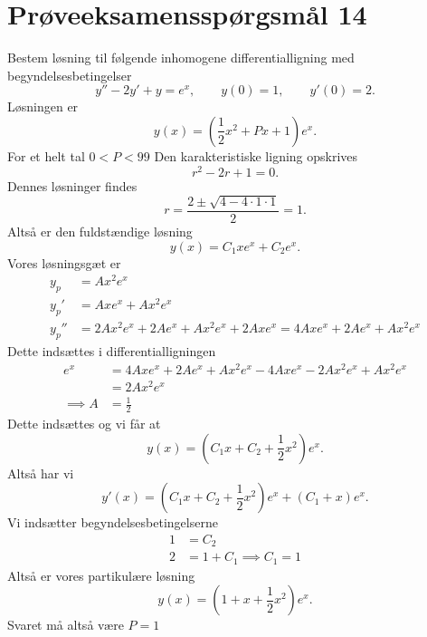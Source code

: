 \documentclass[12pt]{article}
\theoremstyle{definition}
\begin{document}
\section*{Prøveeksamensspørgsmål 14}
Bestem løsning til følgende inhomogene differentialligning med begyndelsesbetingelser
\[
y'' - 2y' + y = e^{x}, \qquad y(0) = 1, \qquad y'(0) = 2
.\]
Løsningen er
\[
y(x) = \left( \frac{1}{2}x^2 + Px + 1 \right)e^x
.\]
For et helt tal $0<P<99$
\bigbreak
Den karakteristiske ligning opskrives
\[
r^2 - 2r + 1 = 0
.\]
Dennes løsninger findes
\[
r = \frac{2 \pm \sqrt{4-4\cdot1 \cdot 1} }{2} = 1 
.\]
Altså er den fuldstændige løsning
\[
y(x) = C_1xe^{x} + C_2e^{x} 
.\]
Vores løsningsgæt er
\begin{align*}
  y_p &= Ax^2e^{x}  \\
  y_p' &= Axe^{x} + Ax^2e^{x} \\
  y_p'' &= 2Ax^2e^{x} + 2Ae^{x} + Ax^2e^{x} + 2Axe^{x} = 4Axe^{x} + 2Ae^{x} + Ax^2e^{x}
\end{align*}
Dette indsættes i differentialligningen
\begin{align*}
  e^{x} &= 4Axe^{x} + 2Ae^{x} + Ax^2e^{x} - 4Axe^{x} - 2Ax^2e^{x} + Ax^2e^{x} \\
  &= 2Ax^2 e^{x}  \\
  \implies A &= \frac{1}{2} 
\end{align*}
Dette indsættes og vi får at
\[
y(x) = \left( C_1x + C_2 + \frac{1}{2}x^2 \right)e^{x} 
.\]
Altså har vi
\[
y'(x) = \left( C_1x + C_2 + \frac{1}{2}x^2 \right) e^{x} + \left( C_1 + x \right)e^{x}
.\]
Vi indsætter begyndelsesbetingelserne
\begin{align*}
1 &= C_2  \\
2 &= 1+C_1 \implies C_1 = 1
\end{align*}
Altså er vores partikulære løsning
\[
y(x) = \left( 1 + x + \frac{1}{2}x^2 \right)e^x
.\]
Svaret må altså være $P=1$
\end{document}
